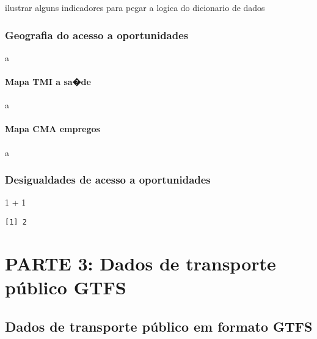 \documentclass[
  letterpaper,
  DIV=11,
  numbers=noendperiod]{scrreprt}
\newenvironment{Shaded}{\begin{snugshade}}{\end{snugshade}}
\newcommand{\DecValTok}[1]{\textcolor[rgb]{0.68,0.00,0.00}{#1}}
\newcommand{\SpecialCharTok}[1]{\textcolor[rgb]{0.37,0.37,0.37}{#1}}
\begin{document}
ilustrar alguns indicadores para pegar a logica do dicionario de dados

\hypertarget{geografia-do-acesso-a-oportunidades}{%
\section{Geografia do acesso a
oportunidades}\label{geografia-do-acesso-a-oportunidades}}

a

\hypertarget{mapa-tmi-a-sade}{%
\subsection{Mapa TMI a sa�de}\label{mapa-tmi-a-sade}}

a

\hypertarget{mapa-cma-empregos}{%
\subsection{Mapa CMA empregos}\label{mapa-cma-empregos}}

a

\hypertarget{desigualdades-de-acesso-a-oportunidades}{%
\section{Desigualdades de acesso a
oportunidades}\label{desigualdades-de-acesso-a-oportunidades}}

\begin{Shaded}
\begin{Highlighting}[]
\DecValTok{1} \SpecialCharTok{+} \DecValTok{1}
\end{Highlighting}
\end{Shaded}

\begin{verbatim}
[1] 2
\end{verbatim}

\part{PARTE 3: Dados de transporte público GTFS}

\hypertarget{dados-de-transporte-puxfablico-em-formato-gtfs}{%
\chapter{Dados de transporte público em formato
GTFS}\label{dados-de-transporte-puxfablico-em-formato-gtfs}}
\end{document}
